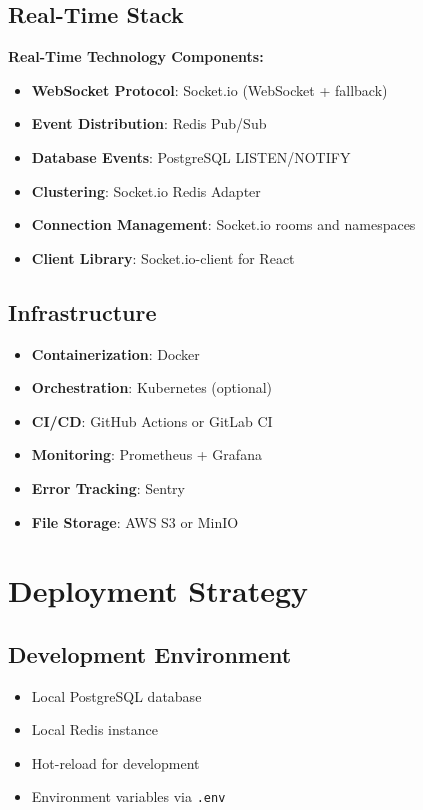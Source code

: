 \documentclass[11pt,a4paper]{article}
\begin{document}
\subsection{Real-Time Stack}
\begin{realtimebox}
\textbf{Real-Time Technology Components:}
\begin{itemize}
    \item \textbf{WebSocket Protocol}: Socket.io (WebSocket + fallback)
    \item \textbf{Event Distribution}: Redis Pub/Sub
    \item \textbf{Database Events}: PostgreSQL LISTEN/NOTIFY
    \item \textbf{Clustering}: Socket.io Redis Adapter
    \item \textbf{Connection Management}: Socket.io rooms and namespaces
    \item \textbf{Client Library}: Socket.io-client for React
\end{itemize}
\end{realtimebox}

\subsection{Infrastructure}
\begin{itemize}
    \item \textbf{Containerization}: Docker
    \item \textbf{Orchestration}: Kubernetes (optional)
    \item \textbf{CI/CD}: GitHub Actions or GitLab CI
    \item \textbf{Monitoring}: Prometheus + Grafana
    \item \textbf{Error Tracking}: Sentry
    \item \textbf{File Storage}: AWS S3 or MinIO
\end{itemize}

\section{Deployment Strategy}

\subsection{Development Environment}
\begin{itemize}
    \item Local PostgreSQL database
    \item Local Redis instance
    \item Hot-reload for development
    \item Environment variables via \texttt{.env}
\end{itemize}
\end{document}
